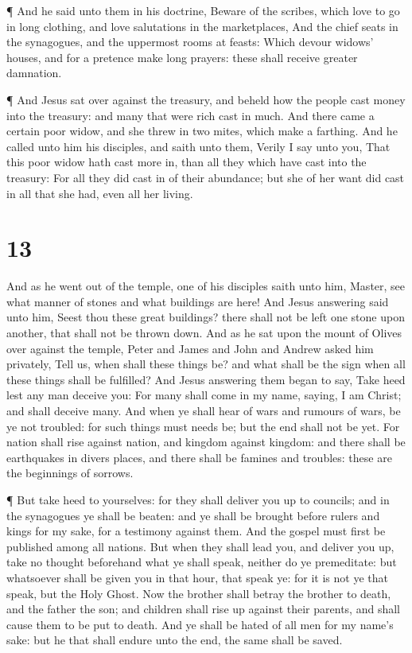  ¶ And he said unto them in his doctrine, Beware of the
scribes, which love to go in long clothing, and love salutations in the
marketplaces,  And the chief seats in the synagogues, and
the uppermost rooms at feasts:  Which devour widows'
houses, and for a pretence make long prayers: these shall receive
greater damnation.

 ¶ And Jesus sat over against the treasury, and beheld how
the people cast money into the treasury: and many that were rich cast in
much.  And there came a certain poor widow, and she threw
in two mites, which make a farthing.  And he called unto
him his disciples, and saith unto them, Verily I say unto you, That this
poor widow hath cast more in, than all they which have cast into the
treasury:  For all they did cast in of their abundance; but
she of her want did cast in all that she had, even all her living.

\hypertarget{section-12}{%
\section{13}\label{section-12}}

 And as he went out of the temple, one of his disciples
saith unto him, Master, see what manner of stones and what buildings are
here!  And Jesus answering said unto him, Seest thou these
great buildings? there shall not be left one stone upon another, that
shall not be thrown down.  And as he sat upon the mount of
Olives over against the temple, Peter and James and John and Andrew
asked him privately,  Tell us, when shall these things be?
and what shall be the sign when all these things shall be fulfilled?
 And Jesus answering them began to say, Take heed lest any
man deceive you:  For many shall come in my name, saying, I
am Christ; and shall deceive many.  And when ye shall hear
of wars and rumours of wars, be ye not troubled: for such things must
needs be; but the end shall not be yet.  For nation shall
rise against nation, and kingdom against kingdom: and there shall be
earthquakes in divers places, and there shall be famines and troubles:
these are the beginnings of sorrows.

 ¶ But take heed to yourselves: for they shall deliver you
up to councils; and in the synagogues ye shall be beaten: and ye shall
be brought before rulers and kings for my sake, for a testimony against
them.  And the gospel must first be published among all
nations.  But when they shall lead you, and deliver you up,
take no thought beforehand what ye shall speak, neither do ye
premeditate: but whatsoever shall be given you in that hour, that speak
ye: for it is not ye that speak, but the Holy Ghost.  Now
the brother shall betray the brother to death, and the father the son;
and children shall rise up against their parents, and shall cause them
to be put to death.  And ye shall be hated of all men for
my name's sake: but he that shall endure unto the end, the same shall be
saved.

